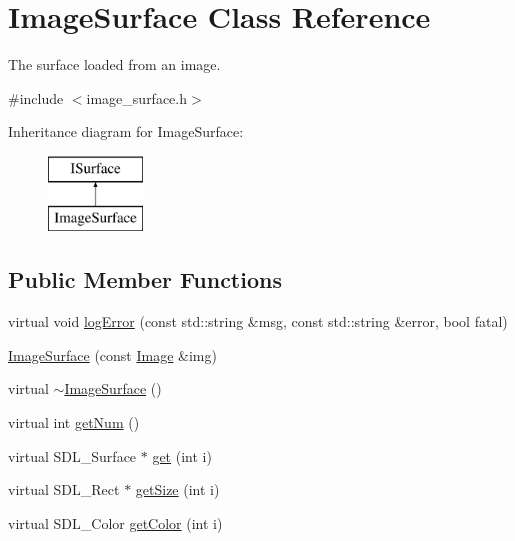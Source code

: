 \hypertarget{class_image_surface}{}\section{Image\+Surface Class Reference}
\label{class_image_surface}


The surface loaded from an image.  




{\ttfamily \#include $<$image\+\_\+surface.\+h$>$}

Inheritance diagram for Image\+Surface\+:\begin{figure}[H]
\begin{center}
\leavevmode
\includegraphics[height=2.000000cm]{class_image_surface}
\end{center}
\end{figure}
\subsection*{Public Member Functions}
\begin{DoxyCompactItemize}
\item 
virtual void \mbox{\hyperlink{class_image_surface_ae19ffbda1d4279894b74f95b0afb81cb}{log\+Error}} (const std\+::string \&msg, const std\+::string \&error, bool fatal)
\item 
\mbox{\hyperlink{class_image_surface_aa0d6aea6a18bad9f802a5ec4a29585bf}{Image\+Surface}} (const \mbox{\hyperlink{class_image}{Image}} \&img)
\item 
virtual \mbox{\hyperlink{class_image_surface_a2e64cbd6f3d98f554bfdd43507e38412}{$\sim$\+Image\+Surface}} ()
\item 
virtual int \mbox{\hyperlink{class_image_surface_a6c503dc8cdc23ff1781309c430506e93}{get\+Num}} ()
\item 
virtual S\+D\+L\+\_\+\+Surface $\ast$ \mbox{\hyperlink{class_image_surface_a029eeccddbb6e028a4556a8c33756a56}{get}} (int i)
\item 
virtual S\+D\+L\+\_\+\+Rect $\ast$ \mbox{\hyperlink{class_image_surface_ac0367fc1d7f0936f5dc6e56118356fff}{get\+Size}} (int i)
\item 
virtual S\+D\+L\+\_\+\+Color \mbox{\hyperlink{class_image_surface_a241efe1b9a9cc78e5033f8beff36eb03}{get\+Color}} (int i)
\end{DoxyCompactItemize}


